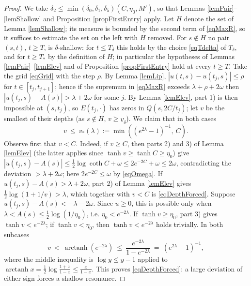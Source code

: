 \documentclass[11pt,twoside,reqno]{amsart}
\def\d{\delta}
\def\arctanh{\operatorname{arctanh}}
\def\uv{\underline{v}_{\d}}
\theoremstyle{plain}
\numberwithin{equation}{section}
\begin{document}
\begin{proof}
We take $\d_2\leq\min(\d_0,\d_1,\d_5)(C,\eta_0,M')$, so that Lemmas \ref{lemPair}--\ref{lemShallow} and Proposition \ref{propFirstEntry} apply. Let $H$ denote the set of Lemma \ref{lemShallow}; its measure is bounded by the second term of \eqref{eqMaxR}, so it suffices to estimate the set on the left with $H$ removed. For $s\notin H$ no pair $(s,t)$, $t\geq T$, is $\d$-shallow: for $t\leq T_\d$ this holds by the choice \eqref{eqTdelta} of $T_\d$, and for $t\geq T_*$ by the definition of $H$; in particular the hypotheses of Lemmas \ref{lemPair}--\ref{lemElev} and of Proposition \ref{propFirstEntry} hold at every $t\geq T$. Take the grid \eqref{eqGrid} with the step $\rho$. By Lemma \ref{lemLip}, $|u(t,s)-u(t_j,s)|\leq\rho$ for $t\in[t_j,t_{j+1}]$; hence if the supremum in \eqref{eqMaxR} exceeds $\lambda+\rho+2\omega$ then $|u(t_j,s)-A(s)|>\lambda+2\omega$ for some $j$. By Lemma \ref{lemElev}, part 1) is then impossible at $(s,t_j)$, so $E(t_j,\cdot)$ has zeros in $Q(s,2C/t_j)$; let $v$ be the smallest of their depths (as $s\notin H$, $v\geq\uv$). We claim that in both cases
\begin{equation}
v\ \leq\ v_*(\lambda):=\min\left(\left(e^{2\lambda}-1\right)^{-1},\ C\right).
\label{eqDepthForced}
\end{equation}
Observe first that $v<C$. Indeed, if $v\geq C$, then parts 2) and 3) of Lemma \ref{lemElev} (the latter applies since $\tanh v\geq\tanh C\geq\eta_0$) give $|u(t_j,s)-A(s)|\leq\frac12\log\coth C+\omega\leq2e^{-2C}+\omega\leq2\omega$, contradicting the deviation $>\lambda+2\omega$; here $2e^{-2C}\leq\omega$ by \eqref{eqOmega}. If $u(t_j,s)-A(s)>\lambda+2\omega$, part 2) of Lemma \ref{lemElev} gives $\frac12\log(1+1/v)>\lambda$, which together with $v<C$ is \eqref{eqDepthForced}. Suppose $u(t_j,s)-A(s)<-\lambda-2\omega$. Since $u\geq0$, this is possible only when $\lambda<A(s)\leq\frac12\log(1/\eta_0)$, i.e. $\eta_0<e^{-2\lambda}$. If $\tanh v\geq\eta_0$, part 3) gives $\tanh v<e^{-2\lambda}$; if $\tanh v<\eta_0$, then $\tanh v<e^{-2\lambda}$ holds trivially. In both subcases
$$v\ <\ \arctanh\left(e^{-2\lambda}\right)\ \leq\ \frac{e^{-2\lambda}}{1-e^{-2\lambda}}\ =\ \left(e^{2\lambda}-1\right)^{-1},$$
where the middle inequality is $\log y\leq y-1$ applied to $\arctanh x=\frac12\log\frac{1+x}{1-x}\leq\frac x{1-x}$. This proves \eqref{eqDepthForced}: a large deviation of either sign forces a shallow resonance.


\end{proof}
\end{document}
